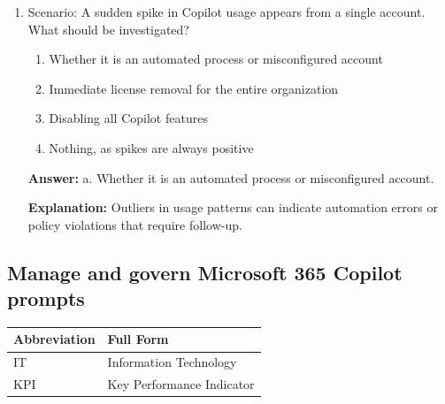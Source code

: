 \documentclass[10pt]{article}
\begin{document}
\begin{enumerate}[leftmargin=*]
\textbf{Explanation:} Low active rates often indicate communication or applicability gaps that can be addressed with focused enablement.

\item Scenario: A sudden spike in Copilot usage appears from a single account. What should be investigated?
\begin{enumerate}[label=\alph*., leftmargin=1.5em]
\item Whether it is an automated process or misconfigured account
\item Immediate license removal for the entire organization
\item Disabling all Copilot features
\item Nothing, as spikes are always positive
\end{enumerate}
\textbf{Answer:} a. Whether it is an automated process or misconfigured account.

\textbf{Explanation:} Outliers in usage patterns can indicate automation errors or policy violations that require follow-up.

\end{enumerate}
\clearpage

\subsection{Manage and govern Microsoft 365 Copilot prompts}

\begin{center}
\begin{tabular}{>{\raggedright\arraybackslash}p{} >{\raggedright\arraybackslash}p{}}
\toprule
\textbf{Abbreviation} & \textbf{Full Form} \\
\midrule
IT & Information Technology \\
KPI & Key Performance Indicator \\
\end{tabular}
\end{center}
\end{document}
